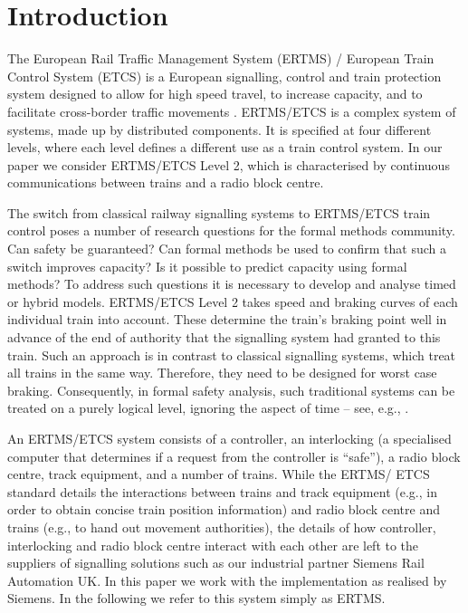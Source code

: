 \section{Introduction}



The European Rail Traffic Management System (ERTMS) / European Train
Control System (ETCS) is a European signalling, control and train
protection system designed to allow for high speed travel, to increase
capacity, and to facilitate cross-border traffic movements
\cite{ERTMS}. ERTMS/ETCS is a complex system of systems, made up by
distributed components. It is specified at four different levels,
where each level defines a different use as a train control system. In
our paper we consider ERTMS/ETCS Level 2, which is characterised by
continuous communications between trains and a radio block centre.

The switch from classical railway signalling systems to ERTMS/ETCS
train control poses a number of research questions for the formal methods
community. Can safety be guaranteed? Can formal methods be used to
confirm that such a switch improves capacity? Is it possible to
predict capacity using formal methods? To address such questions it is
necessary to develop and analyse timed or hybrid models. ERTMS/ETCS
Level 2 takes speed and braking curves of each individual train into
account. These determine the train's braking point well in advance of
the end of authority that the signalling system had granted to this
train. Such an approach is in contrast to classical signalling
systems, which treat all trains in the same way. Therefore, they need
to be designed for worst case braking. Consequently, in
formal safety analysis, such traditional systems can be treated on a purely
logical level, ignoring the aspect of time -- see, e.g.,
\cite{sttt14,JamesMNRST14}.

An ERTMS/ETCS system consists of a controller, an interlocking (a
specialised computer that determines if a request from the controller
is ``safe''), a radio block centre, track equipment, and a number of
trains. While the ERTMS/ ETCS standard details the interactions between
trains and track equipment (e.g., in order to obtain concise train
position information) and radio block centre and trains (e.g., to hand
out movement authorities), the details of how controller, interlocking
and radio block centre interact with each other are left to the
suppliers of signalling solutions such as our industrial partner
Siemens Rail Automation UK. In this paper we work with
the implementation as realised by Siemens. In the following we refer
to this system simply as ERTMS.


